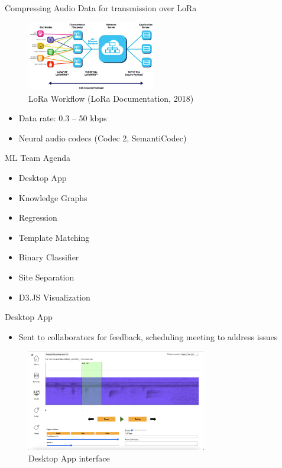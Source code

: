 \begin{frame}{Compressing Audio Data for transmission over LoRa}
    \begin{figure}
        \centering
        \includegraphics[height=0.45\textheight,width=0.5\textwidth,keepaspectratio]{images/LoRa_diagram.png}
        \caption{LoRa Workflow (LoRa Documentation, 2018)}
    \end{figure}
    \begin{itemize}
        \item Data rate: 0.3 – 50 kbps
        \item Neural audio codecs (Codec 2, SemantiCodec)
    \end{itemize}    
\end{frame}

\begin{frame}{ML Team Agenda}
    \begin{itemize}
        \item Desktop App
        \item Knowledge Graphs
        \item Regression
        \item Template Matching
        \item Binary Classifier
        \item Site Separation
        \item D3.JS Visualization
    \end{itemize}
\end{frame}

\begin{frame}{Desktop App}
    \begin{itemize}
        \item Sent to collaborators for feedback, scheduling meeting to address issues
    \end{itemize}
    \begin{figure}
        \centering
        \includegraphics[height=0.7\textheight,width=0.7\textwidth,keepaspectratio]{images/desktop_app_1.png}
        \caption{Desktop App interface}
    \end{figure}
\end{frame}

